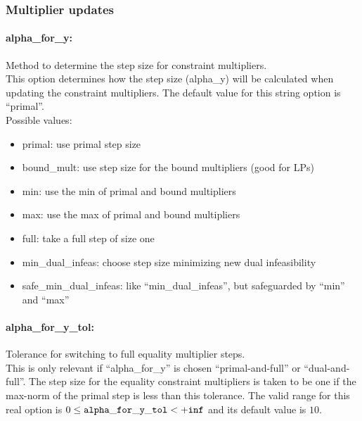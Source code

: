 \subsubsection{Multiplier updates}

\paragraph{alpha\_for\_y:} Method to determine the step size for constraint multipliers. $\;$ \\
 This option determines how the step size
(alpha\_y) will be calculated when updating the
constraint multipliers.
The default value for this string option is ``primal''.
\\ 
Possible values:
\begin{itemize}
   \item primal: use primal step size
   \item bound\_mult: use step size for the bound multipliers (good
for LPs)
   \item min: use the min of primal and bound multipliers
   \item max: use the max of primal and bound multipliers
   \item full: take a full step of size one
   \item min\_dual\_infeas: choose step size minimizing new dual
infeasibility
   \item safe\_min\_dual\_infeas: like ``min\_dual\_infeas'', but safeguarded by
``min'' and ``max''
\end{itemize}

\paragraph{alpha\_for\_y\_tol:} Tolerance for switching to full equality multiplier steps. $\;$ \\
 This is only relevant if ``alpha\_for\_y'' is
chosen ``primal-and-full'' or ``dual-and-full''.  The
step size for the equality constraint multipliers
is taken to be one if the max-norm of the primal
step is less than this tolerance. The valid range for this real option is 
$0 \le {\tt alpha\_for\_y\_tol } <  {\tt +inf}$
and its default value is $10$.

